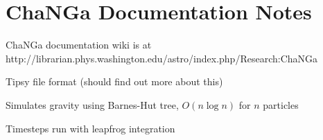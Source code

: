 \documentclass[11pt,letterpaper]{article}
\begin{document}
\section*{ChaNGa Documentation Notes}
ChaNGa documentation wiki is at 
http://librarian.phys.washington.edu/astro/index.php/Research:ChaNGa
\begin{bullets}
\item Tipsy file format (should find out more about this)
\item Simulates gravity using Barnes-Hut tree, $O(n\log n)$ for $n$ particles
\item Timesteps run with leapfrog integration
\end{bullets}
\end{document}
